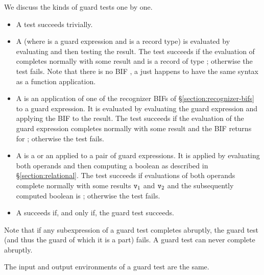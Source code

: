 \EVALUATION

We discuss the kinds of guard tests one by one.

\label{section:record2}

\begin{itemize}
\item {}
A  test succeeds trivially.
\item {}
A   (where  is a guard
expression and  is a record type) is evaluated by evaluating 
and then testing the result.  The test succeeds if the evaluation of 
completes normally with some result  and  is a record of type ;
otherwise the
test fails.  Note that there is no BIF , a 
just happens to have the same syntax as a function application.
\item {}
A  is an application of one of the recognizer
BIFs of \S\ref{section:recognizer-bifs} to a guard expression.  It is
evaluated by evaluating the guard expression and applying the BIF to
the result.  The test succeeds if the evaluation of the guard
expression completes normally with some result 
and the BIF returns  for ; otherwise the test fails.
\item {}
A  is a  or an
 applied to a pair of guard expressions.  It is applied
by evaluating both operands and then computing a boolean as described
in \S\ref{section:relational}.  The test succeeds if evaluations of
both operands complete normally with some results ${\tt{\sl v}}_1$ and
${\tt{\sl v}}_2$ and the subsequently computed boolean is ;
otherwise the test fails.
\item {}
A   succeeds if, and only if,
the guard test  succeeds.
\end{itemize}
Note that if any subexpression of a guard test completes abruptly, the
guard test (and thus the guard of which it is a part) fails.  A guard
test can never complete abruptly.

\ENVIRONMENTS

The input and output environments of a guard test are the same.

